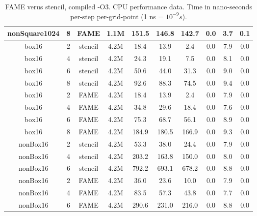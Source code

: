 {\begin{table}[hbt]
\begin{tabular}{|c|c|c|c|c|c|c|c|c|c|}
  nonSquare1024 & 8 & FAME  & 1.1M  &   151.5 &   146.8 &   142.7 &     0.0 &     3.7 &     0.1   \\
  \hline
  \hline
  box16 & 2 & stencil  & 4.2M  &    18.4 &    13.9 &     2.4 &     0.0 &     7.9 &     0.0   \\
  box16 & 4 & stencil  & 4.2M  &    24.3 &    19.1 &     7.5 &     0.0 &     8.1 &     0.0   \\
  box16 & 6 & stencil  & 4.2M  &    50.6 &    44.0 &    31.3 &     0.0 &     9.0 &     0.0   \\
  box16 & 8 & stencil  & 4.2M  &    92.6 &    88.3 &    74.5 &     0.0 &     9.4 &     0.0   \\
  \hline
  box16 & 2 & FAME  & 4.2M  &    18.4 &    13.9 &     2.4 &     0.0 &     7.9 &     0.0   \\
  box16 & 4 & FAME  & 4.2M  &    34.8 &    29.6 &    18.4 &     0.0 &     7.6 &     0.0   \\
  box16 & 6 & FAME  & 4.2M  &    75.3 &    68.7 &    56.1 &     0.0 &     8.9 &     0.0   \\
  box16 & 8 & FAME  & 4.2M  &   184.9 &   180.5 &   166.9 &     0.0 &     9.3 &     0.0   \\
   \hline
  \hline
  nonBox16 & 2 & stencil  & 4.2M  &    53.3 &    38.0 &    24.4 &     0.0 &     7.9 &     0.0   \\
  nonBox16 & 4 & stencil  & 4.2M  &   203.2 &   163.8 &   150.0 &     0.0 &     8.0 &     0.0   \\
  nonBox16 & 6 & stencil  & 4.2M  &   792.2 &   693.1 &   678.2 &     0.0 &     8.8 &     0.0   \\
  \hline
  nonBox16 & 2 & FAME  & 4.2M  &    36.0 &    23.6 &    10.0 &     0.0 &     7.9 &     0.0   \\
  nonBox16 & 4 & FAME  & 4.2M  &    83.5 &    57.3 &    43.8 &     0.0 &     7.7 &     0.0   \\
  nonBox16 & 6 & FAME  & 4.2M  &   290.6 &   231.0 &   216.0 &     0.0 &     8.8 &     0.0   \\     
\hline  
\end{tabular}
\caption{FAME verus stencil, compiled -O3. CPU performance data. 
Time in nano-seconds per-step per-grid-point (1 ns = $10^{-9}s$).
}
\label{tab:cpuPerformanceFAMEvStencil1}    
\end{table}
}

